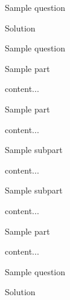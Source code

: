 \documentclass[12pt]{article} %
\begin{document}
\begin{qstn}[4][][]
	Sample question
\begin{soln}
	Solution
\end{soln}
\end{qstn}

\begin{qstn}[5][][]
	Sample question
\begin{assgnenum}
	\qitem Sample part
	\begin{soln}
		content...
	\end{soln}
	\qitem Sample part
	\begin{soln}
		content...
	\end{soln}
	\begin{assgnenum}
		\qitem Sample subpart
		\begin{soln}
			content...
		\end{soln}
		\qitem Sample subpart
		\begin{soln}
			content...
		\end{soln}
	\end{assgnenum}
	\qitem Sample part
	\begin{soln}
		content...
	\end{soln}
\end{assgnenum}
\end{qstn}

\begin{qstn}[6][][]
	Sample question
\begin{soln}
	Solution
\end{soln}
\end{qstn}
\end{document}
